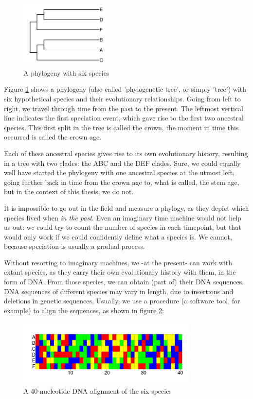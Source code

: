 \begin{figure}[H]
  \includegraphics[width=0.4\textwidth]{phylogeny.png}
  \caption{
    A phylogeny with six species
  }
  \label{fig:phylogeny}
\end{figure}

Figure \ref{fig:phylogeny} shows a phylogeny (also called 'phylogenetic tree', 
or simply 'tree') with six hypothetical species and their evolutionary 
relationships. Going from left to right, we travel through time from 
the past to the present. 
The leftmost vertical line indicates the first speciation event, 
which gave rise to the first two ancestral species. 
This first split in the tree is called the crown,
the moment in time this occurred is called the crown age.

Each of these ancestral species gives rise to its own evolutionary history,
resulting in a tree with two clades: the ABC and the DEF clades.
Sure, we could equally well have started the phylogeny 
with one ancestral species at the utmost left,
going further back in time from the crown age to, what is called, the stem age,
but in the context of this thesis, we do not.

It is impossible to go out in the field and measure a phylogy, 
as they depict which species lived when \emph{in the past}. 
Even an imaginary time machine would not help us out:
we could try to count the number of species in each timepoint,
but that would only work if we could confidently define what a
species is. We cannot, because speciation is usually a gradual process.

Without resorting to imaginary machines,
we -at the present- can work with extant species, 
as they carry their own evolutionary history with them, 
in the form of DNA. From those species, 
we can obtain (part of) their DNA sequences. 
DNA sequences of different species 
may vary in length, due to insertions and deletions in genetic sequences,
Usually, we use a procedure (a software tool, for example) to align 
the sequences, as shown in figure \ref{fig:alignment}:

\begin{figure}[H]
  \includegraphics[width=0.8\textwidth]{alignment_40.png}
  \caption{
    A 40-nucleotide DNA alignment of the six species
  }
  \label{fig:alignment}
\end{figure}

